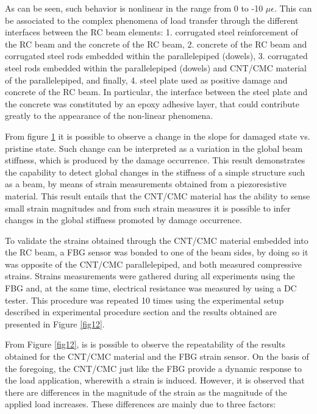 \documentclass[twocolumn]{bmcart}%
\begin{document}
 As can be seen, such behavior is nonlinear in the range from 0 to -10 $\mu \epsilon$. This can be associated to the complex phenomena of load transfer through the different interfaces between the RC beam elements: 1. corrugated steel reinforcement of the RC beam and the concrete of the RC beam, 2. concrete of the RC beam and corrugated steel rods embedded within the parallelepiped (dowels), 3. corrugated steel rods embedded within the parallelepiped (dowels)  and CNT/CMC material of the parallelepiped, and finally, 4. steel plate used as positive damage and concrete of the RC beam. In particular, the interface between the steel plate and the concrete was constituted by an epoxy adhesive layer, that could contribute greatly to the appearance of the non-linear phenomena.

\begin{figure}[h!]
  \caption{
      }
      \label{fig11}
      \end{figure}


From figure \ref{fig11} it is possible to observe a change in the slope for damaged state vs. pristine state. Such change can be interpreted as a variation in the global beam stiffness, which is produced by the damage occurrence. This result demonstrates the capability to detect global changes in the stiffness of a simple structure such as a beam, by means of strain measurements obtained from a piezoresistive material. This result entails that the CNT/CMC material has the ability to sense small strain magnitudes and from such strain measures it is possible to infer changes in the global stiffness promoted by damage occurrence.

To validate the strains obtained through the CNT/CMC material embedded into the RC beam, a FBG sensor was bonded to one of the beam sides, by doing so it was opposite of the CNT/CMC parallelepiped, and both measured compressive strains. Strains measurements were gathered during all experiments using the FBG and, at the same time, electrical resistance was measured by using a DC tester. This procedure was repeated 10 times using the experimental setup described in experimental procedure section and the results obtained are presented in Figure \ref{fig12}.

From Figure \ref{fig12}, is is possible to observe the repeatability of the results obtained for the CNT/CMC material and the FBG strain sensor. On the basis of the foregoing, the CNT/CMC just like the FBG provide a dynamic response to the load application, wherewith a strain is induced. However, it is observed that there are differences in the magnitude of the strain as the magnitude of the applied load increases. These differences are mainly due to three factors: 
\end{document}
